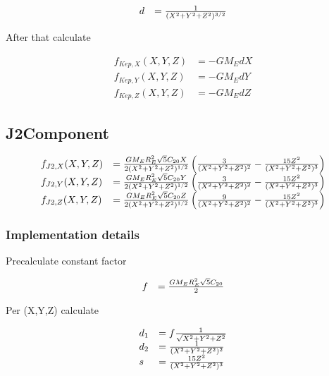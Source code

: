 \documentclass{article}
\begin{document}
\begin{equation}
\begin{array}{ll}
d &= {1\over (X^2+Y^2+Z^2)^{3/2}}
\end{array}
\end{equation}

After that calculate

\begin{equation}
\begin{array}{ll}
f_{Kep,X}(X,Y,Z) &= -GM_EdX\\
f_{Kep,Y}(X,Y,Z) &= -GM_EdY\\
f_{Kep,Z}(X,Y,Z) &= -GM_EdZ
\end{array}
\end{equation}

\subsection{J2Component}

\begin{equation}
\begin{array}{ll}
f_{J2,X}(X,Y,Z) &=
{GM_ER_E^2\sqrt{5}C_{20} X\over 2(X^2+Y^2+Z^2)^{1/2}} \left({3\over(X^2+Y^2+Z^2)^2}-{15Z^2\over(X^2+Y^2+Z^2)^3}\right) \\
f_{J2,Y}(X,Y,Z) &=
{GM_ER_E^2\sqrt{5}C_{20} Y\over 2(X^2+Y^2+Z^2)^{1/2}} \left({3\over(X^2+Y^2+Z^2)^2}-{15Z^2\over(X^2+Y^2+Z^2)^3}\right) \\
f_{J2,Z}(X,Y,Z) &=
{GM_ER_E^2\sqrt{5}C_{20} Z\over 2(X^2+Y^2+Z^2)^{1/2}} \left({9\over(X^2+Y^2+Z^2)^2}-{15Z^2\over(X^2+Y^2+Z^2)^3}\right)
\end{array}
\end{equation}

\subsubsection{Implementation details}

Precalculate constant factor

\begin{equation}
\begin{array}{ll}
f &= {GM_ER_E^2\sqrt{5}C_{20}\over 2}
\end{array}
\end{equation}

Per (X,Y,Z) calculate

\begin{equation}
\begin{array}{ll}
d_1 &= {f{1\over \sqrt{X^2+Y^2+Z^2}}} \\
d_2 &= {1\over (X^2+Y^2+Z^2)^2} \\
s &= {15Z^2\over (X^2+Y^2+Z^2)^3}
\end{array}
\end{equation}
\end{document}
